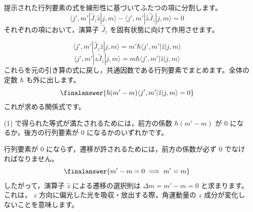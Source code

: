 \solutionheading
\begin{solutionparts}

提示された行列要素の式を線形性に基づいてふたつの項に分割します。
\begin{equation*}
\langle j', m'|\hat{J}_z \hat{z}|j, m\rangle - \langle j', m'|\hat{z} \hat{J}_z|j, m\rangle = 0
\end{equation*}
それぞれの項において，演算子 $\hat{J}_z$ を固有状態に向けて作用させます。
\par
{}
\begin{equation*}
\langle j', m'|\hat{J}_z \hat{z}|j, m\rangle = m'\hbar \langle j', m'|\hat{z}|j, m\rangle
\end{equation*}
\begin{equation*}
\langle j', m'|\hat{z} \hat{J}_z|j, m\rangle = m\hbar \langle j', m'|\hat{z}|j, m\rangle
\end{equation*}
これらを元の引き算の式に戻し，共通因数である行列要素でまとめます。全体の定数 $\hbar$ も外に出します。
\begin{equation*}
\finalanswer{\hbar (m' - m) \langle j', m'|\hat{z}|j, m\rangle = 0}
\end{equation*}
これが求める関係式です。

(1) で得られた等式が満たされるためには，前方の係数 $\hbar (m' - m)$ が 0 になるか，後方の行列要素が 0 になるかのいずれかです。
\par
行列要素が 0 にならず，遷移が許されるためには，前方の係数が必ず 0 でなければなりません。
\begin{equation*}
\finalanswer{m' - m = 0 \implies m' = m}
\end{equation*}
したがって，演算子 $\hat{z}$ による遷移の選択則は $\Delta m = m' - m = 0$ と求まります。これは， $z$ 方向に偏光した光を吸収・放出する際，角運動量の $z$ 成分が変化しないことを意味します。


\end{solutionparts}
